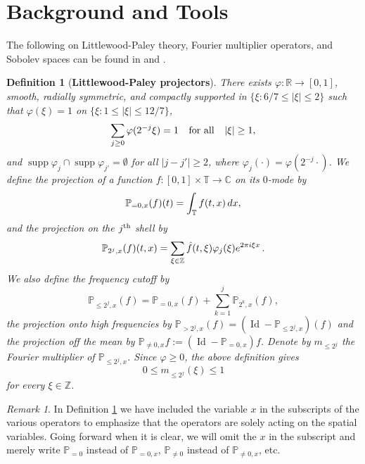 \documentclass[12pt,reqno,letterpaper]{amsart}
\numberwithin{equation}{section}
\newcommand{\1}{{\bf 1}}
\newcommand{\2}{{\bf 2}}
\newcommand{\C}{\mathbb C}
\newcommand{\R}{\mathbb R}
\newcommand{\T}{\mathbb T}
\newcommand{\Z}{\mathbb Z}
\newtheorem{definition}[theorem]{Definition}
\theoremstyle{remark}
\newtheorem{remark}[theorem]{Remark}
\theoremstyle{remark}
\begin{document}
 
\section{Background and Tools}\label{sec:2}


The following on Littlewood-Paley theory, Fourier multiplier operators, and Sobolev spaces can be found in \cite{BCD} and \cite{Grafakos}.

\begin{definition}[\textbf{Littlewood-Paley projectors}]\label{def:projs}
    There exists $\varphi \colon \R\to[0,1]$, smooth, radially symmetric, and compactly supported in $\{\xi : 6/7 \leq |\xi|\leq 2\}$ such that $\varphi(\xi) = 1$ on $\{\xi : 1 \leq |\xi| \leq 12/7\}$,
    \begin{equation}
        \sum_{j\geq 0}\varphi(2^{-j}\xi)=1 \hspace{0.25cm} \text{ for all } \hspace{0.25cm} |\xi|\geq 1, \notag
    \end{equation}
    and $\operatorname{supp}\varphi_{j}\cap \operatorname{supp} \varphi_{j'}=\emptyset$ for all $|j-j'|\geq 2$, where $\varphi_j(\cdot) = \varphi(2^{-j}\cdot)$. We define the projection of a function $f:[0,1] \times \T \to \C$ on its $0$-mode by
    \begin{equation}
        \mathbb{P}_{=0,x}(f)(t)=\int_{\T} f(t,x)\, dx, \notag
    \end{equation}
    and the projection on the $j^{\rm th}$ shell by
    \begin{equation}
        \mathbb{P}_{2^j,x}(f)(t,x)=\sum_{\xi\in \Z}\hat{f}(t,\xi)\varphi_{j}(\xi)e^{2\pi i\xi x} \, . \notag
    \end{equation}
    We also define the frequency cutoff by
    $$
    \mathbb{P}_{\leq 2^j,x}(f) = \mathbb{P}_{=0,x}(f) + \sum_{k=1}^j \mathbb{P}_{2^k,x}(f),
    $$
    the projection onto high frequencies by $\mathbb{P}_{>2^j,x}(f) = (\operatorname{Id} - \mathbb{P}_{\leq 2^j,x})(f)$ and the projection off the mean by $\mathbb{P}_{\neq 0,x}f:=(\operatorname{Id}-\mathbb{P}_{=0,x})f$. 
    Denote by $m_{\le 2^j}$ the Fourier multiplier of $\mathbb P_{\le 2^j,x}$. Since $\varphi\ge0$, the above definition gives 
    \[
    0\le m_{\le 2^j}(\xi)\le 1
    \]
    for every $\xi\in\mathbb Z$.
\end{definition}

\begin{remark}
    In Definition \ref{def:projs} we have included the variable $x$ in the subscripts of the various operators to emphasize that the operators are solely acting on the spatial variables. Going forward when it is clear, we will omit the $x$ in the subscript and merely write $\mathbb{P}_{=0}$ instead of $\mathbb{P}_{=0,x}$, $\mathbb{P}_{\not=0}$ instead of $\mathbb{P}_{\not=0,x}$, etc.
\end{remark}
\end{document}
